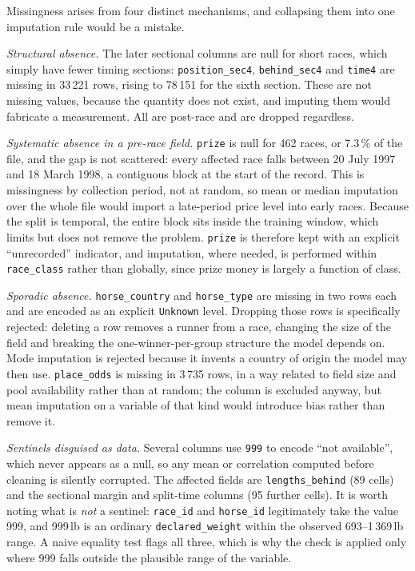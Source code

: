 Missingness arises from four distinct mechanisms, and collapsing them into
one imputation rule would be a mistake.

\emph{Structural absence.} The later sectional columns are null for short
races, which simply have fewer timing sections: \texttt{position\_sec4},
\texttt{behind\_sec4} and \texttt{time4} are missing in 33\,221 rows,
rising to 78\,151 for the sixth section. These are not missing values,
because the quantity does not exist, and imputing them would fabricate a
measurement. All are post-race and are dropped regardless.

\emph{Systematic absence in a pre-race field.} \texttt{prize} is null for
462 races, or 7.3\,\% of the file, and the gap is not scattered: every
affected race falls between 20 July 1997 and 18 March 1998, a contiguous
block at the start of the record. This is missingness by collection
period, not at random, so mean or median imputation over the whole file
would import a late-period price level into early races. Because the split
is temporal, the entire block sits inside the training window, which
limits but does not remove the problem. \texttt{prize} is therefore kept
with an explicit ``unrecorded'' indicator, and imputation, where needed,
is performed within \texttt{race\_class} rather than globally, since prize
money is largely a function of class.

\emph{Sporadic absence.} \texttt{horse\_country} and \texttt{horse\_type}
are missing in two rows each and are encoded as an explicit
\texttt{Unknown} level. Dropping those rows is specifically rejected:
deleting a row removes a runner from a race, changing the size of the
field and breaking the one-winner-per-group structure the model depends
on. Mode imputation is rejected because it invents a country of origin the
model may then use. \texttt{place\_odds} is missing in 3\,735 rows, in a
way related to field size and pool availability rather than at random; the
column is excluded anyway, but mean imputation on a variable of that kind
would introduce bias rather than remove it.

\emph{Sentinels disguised as data.} Several columns use \texttt{999} to
encode ``not available'', which never appears as a null, so any mean or
correlation computed before cleaning is silently corrupted. The affected
fields are \texttt{lengths\_behind} (89 cells) and the sectional margin
and split-time columns (95 further cells). It is worth noting what is
\emph{not} a sentinel: \texttt{race\_id} and \texttt{horse\_id} legitimately
take the value 999, and 999\,lb is an ordinary \texttt{declared\_weight}
within the observed 693--1\,369\,lb range. A naive equality test flags all
three, which is why the check is applied only where 999 falls outside the
plausible range of the variable.

